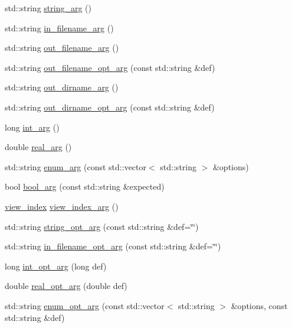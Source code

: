 \begin{DoxyCompactItemize}
std\+::string \hyperlink{namespacetlz_a0621d598fb83b13bf028f3e6293d04f8}{string\+\_\+arg} ()
\item 
std\+::string \hyperlink{namespacetlz_a634de7ca11e100e4a118dffe80376a75}{in\+\_\+filename\+\_\+arg} ()
\item 
std\+::string \hyperlink{namespacetlz_a65770a2c1ff57c5ae6542d4465a3d3f4}{out\+\_\+filename\+\_\+arg} ()
\item 
std\+::string \hyperlink{namespacetlz_a4791154460ea7bf2fa5984b1748bc9d1}{out\+\_\+filename\+\_\+opt\+\_\+arg} (const std\+::string \&def)
\item 
std\+::string \hyperlink{namespacetlz_a0783a9e66143c507b2680fc68834657c}{out\+\_\+dirname\+\_\+arg} ()
\item 
std\+::string \hyperlink{namespacetlz_a401e3de191fb11547a91972b97244c3a}{out\+\_\+dirname\+\_\+opt\+\_\+arg} (const std\+::string \&def)
\item 
long \hyperlink{namespacetlz_af0d1e8ba5b9f2dbc2b589afab3a21fc8}{int\+\_\+arg} ()
\item 
double \hyperlink{namespacetlz_a63246890b0c946b5f62a1d3e2bea6103}{real\+\_\+arg} ()
\item 
std\+::string \hyperlink{namespacetlz_aea648783e0ac6c50afae30a01cfc260d}{enum\+\_\+arg} (const std\+::vector$<$ std\+::string $>$ \&options)
\item 
bool \hyperlink{namespacetlz_ac18630fe66cc71c8cc5eb6acce057f5f}{bool\+\_\+arg} (const std\+::string \&expected)
\item 
\hyperlink{structtlz_1_1view__index}{view\+\_\+index} \hyperlink{namespacetlz_abea9308e4287a82deb9e44e7cc9782a0}{view\+\_\+index\+\_\+arg} ()
\item 
std\+::string \hyperlink{namespacetlz_a8d3380a8873e542207e21a4384957425}{string\+\_\+opt\+\_\+arg} (const std\+::string \&def=\char`\"{}\char`\"{})
\item 
std\+::string \hyperlink{namespacetlz_a89b5e26ad069ef85937a1cb5f20c1d64}{in\+\_\+filename\+\_\+opt\+\_\+arg} (const std\+::string \&def=\char`\"{}\char`\"{})
\item 
long \hyperlink{namespacetlz_a59931291e2fb8d804edf4ea1b95c35d9}{int\+\_\+opt\+\_\+arg} (long def)
\item 
double \hyperlink{namespacetlz_ab2ef4a40b14d664e0a0859866f06eff5}{real\+\_\+opt\+\_\+arg} (double def)
\item 
std\+::string \hyperlink{namespacetlz_a7eb41c397465c7f7ae15dd4aa1de2383}{enum\+\_\+opt\+\_\+arg} (const std\+::vector$<$ std\+::string $>$ \&options, const std\+::string \&def)

\end{DoxyCompactItemize}
